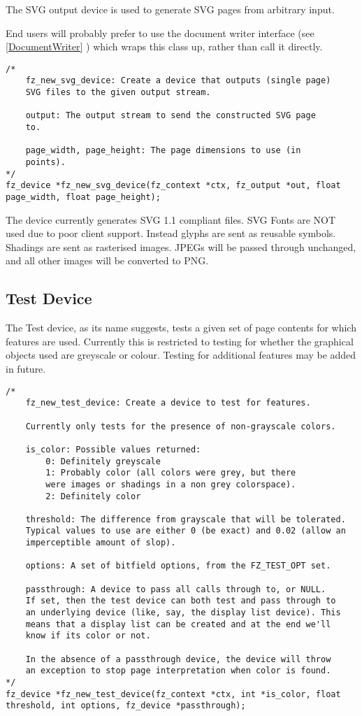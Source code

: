 \documentclass[oneside]{book}
\newcommand{\rjwref}[1] {\autoref{#1} \nameref{#1}}
\begin{document}
The SVG output device is used to generate SVG pages from arbitrary input.

End users will probably prefer to use the document writer interface (see \rjwref{DocumentWriter}) which wraps this class up, rather than call it directly.

\begin{lstlisting}
/*
	fz_new_svg_device: Create a device that outputs (single page)
	SVG files to the given output stream.

	output: The output stream to send the constructed SVG page
	to.

	page_width, page_height: The page dimensions to use (in
	points).
*/
fz_device *fz_new_svg_device(fz_context *ctx, fz_output *out, float page_width, float page_height);
\end{lstlisting}

The device currently generates SVG 1.1 compliant files. SVG Fonts are NOT used due to poor client support. Instead glyphs are sent as reusable symbols. Shadings are sent as rasterised images. JPEGs will be passed through unchanged, and all other images will be converted to PNG.

\subsection{Test Device}

The Test device, as its name suggests, tests a given set of page contents for which features are used. Currently this is restricted to testing for whether the graphical objects used are greyscale or colour. Testing for additional features may be added in future.

\begin{lstlisting}
/*
	fz_new_test_device: Create a device to test for features.

	Currently only tests for the presence of non-grayscale colors.

	is_color: Possible values returned:
		0: Definitely greyscale
		1: Probably color (all colors were grey, but there
		were images or shadings in a non grey colorspace).
		2: Definitely color

	threshold: The difference from grayscale that will be tolerated.
	Typical values to use are either 0 (be exact) and 0.02 (allow an
	imperceptible amount of slop).

	options: A set of bitfield options, from the FZ_TEST_OPT set.

	passthrough: A device to pass all calls through to, or NULL.
	If set, then the test device can both test and pass through to
	an underlying device (like, say, the display list device). This
	means that a display list can be created and at the end we'll
	know if its color or not.

	In the absence of a passthrough device, the device will throw
	an exception to stop page interpretation when color is found.
*/
fz_device *fz_new_test_device(fz_context *ctx, int *is_color, float threshold, int options, fz_device *passthrough);
\end{lstlisting}
\end{document}
